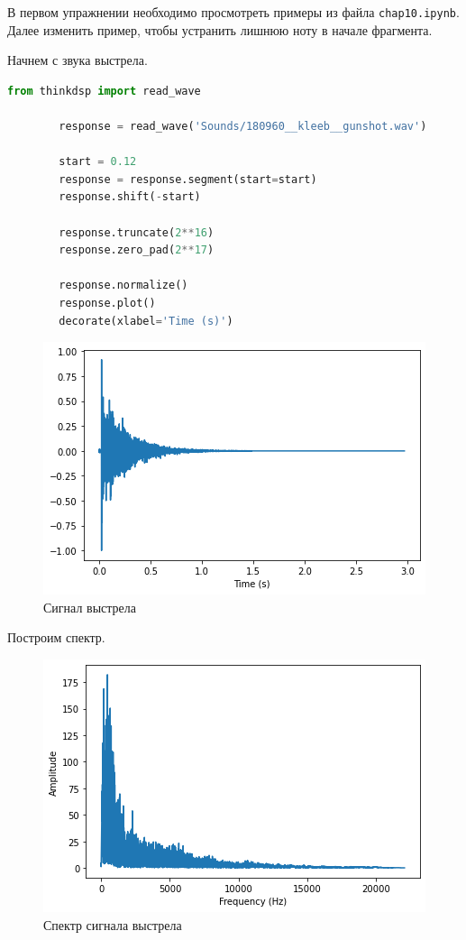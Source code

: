 \documentclass[a4paper, 14pt]{extarticle}
\begin{document}
    В первом упражнении необходимо просмотреть примеры из файла \texttt{chap10.ipynb}.
    Далее изменить пример, чтобы устранить лишнюю ноту в начале фрагмента.

    Начнем с звука выстрела.

    \begin{lstlisting}[language=Python, caption= Считывание и обработка сигнала, label={lst:read_wave_gunshot}]
        from thinkdsp import read_wave

        response = read_wave('Sounds/180960__kleeb__gunshot.wav')

        start = 0.12
        response = response.segment(start=start)
        response.shift(-start)

        response.truncate(2**16)
        response.zero_pad(2**17)

        response.normalize()
        response.plot()
        decorate(xlabel='Time (s)')
    \end{lstlisting}

    \begin{figure}[H]
        \centering
        \includegraphics[width=0.8\linewidth]{gunshot_wave}
        \caption{Сигнал выстрела}
        \label{fig:gunshot_wave}
    \end{figure}

    Построим спектр.

    \begin{figure}[H]
        \centering
        \includegraphics[width=0.8\linewidth]{gunshot_spectrum}
        \caption{Спектр сигнала выстрела}
        \label{fig:gunshot_spectrum}
    \end{figure}
\end{document}
